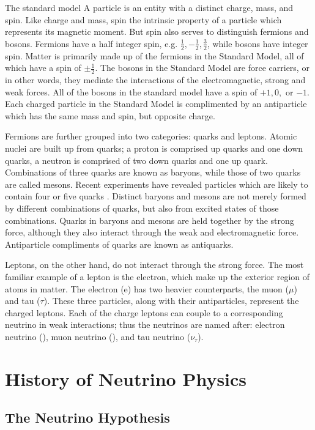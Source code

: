 The standard model A particle is an entity with a distinct charge, mass, and spin.  Like charge and mass, spin the intrinsic property of a particle which represents its magnetic moment.  But spin also serves to distinguish fermions and bosons. Fermions have a half integer spin, e.g. $\frac{1}{2}, -\frac{1}{2}, \frac{3}{2}$, while bosons have integer spin.  Matter is primarily made up of the fermions in the Standard Model, all of which have a spin of $\pm \frac{1}{2}$.  The bosons in the Standard Model are force carriers, or in other words, they mediate the interactions of the electromagnetic, strong and weak forces.  All of the bosons in the standard model have a spin of $+1, 0, $ or $ -1$.  Each charged particle in the Standard Model is complimented by an antiparticle which has the same mass and spin, but opposite charge. \cite{halzen1984quarks}

Fermions are further grouped into two categories: quarks and leptons.  Atomic nuclei are built up from quarks; a proton is comprised up quarks and one down quarks, a neutron is comprised of two down quarks and one up quark.  Combinations of three quarks are known as baryons, while those of two quarks are called mesons.  Recent experiments have revealed particles which are likely to contain four or five quarks \cite{dias2013z_,barth2003evidence}.  Distinct baryons and mesons are not merely formed by different combinations of quarks, but also from excited states of those combinations.  Quarks in baryons and mesons are held together by the strong force, although they also interact through the weak and electromagnetic force.  Antiparticle compliments of quarks are known as antiquarks.  \cite{halzen1984quarks}

Leptons, on the other hand, do not interact through the strong force.  The most familiar example of a lepton is the electron, which make up the exterior region of atoms in matter.  The electron (e) has two heavier counterparts, the muon ($\mu$) and tau ($\tau$).  These three particles, along with their antiparticles, represent the charged leptons.  Each of the charge leptons can couple to a corresponding neutrino in weak interactions; thus the neutrinos are named after: electron neutrino (\nue), muon neutrino (\numu), and tau neutrino ($\nu_\tau$).

\section{History of Neutrino Physics}

\subsection{The Neutrino Hypothesis}

